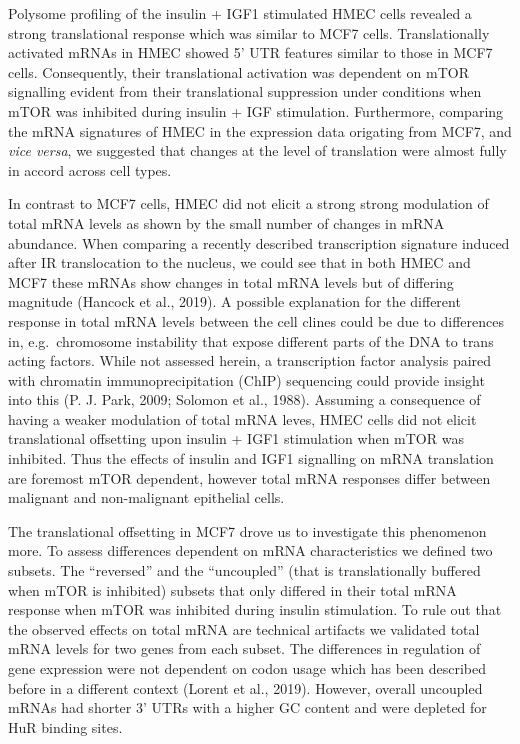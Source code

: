 \documentclass[12pt,openany]{book}
\begin{document}
Polysome profiling of the insulin + IGF1 stimulated HMEC cells revealed
a strong translational response which was similar to MCF7 cells.
Translationally activated mRNAs in HMEC showed 5' UTR features similar
to those in MCF7 cells. Consequently, their translational activation was
dependent on mTOR signalling evident from their translational
suppression under conditions when mTOR was inhibited during insulin +
IGF stimulation. Furthermore, comparing the mRNA signatures of HMEC in
the expression data origating from MCF7, and \emph{vice versa}, we
suggested that changes at the level of translation were almost fully in
accord across cell types.

In contrast to MCF7 cells, HMEC did not elicit a strong strong
modulation of total mRNA levels as shown by the small number of changes
in mRNA abundance. When comparing a recently described transcription
signature induced after IR translocation to the nucleus, we could see
that in both HMEC and MCF7 these mRNAs show changes in total mRNA levels
but of differing magnitude (Hancock et al., 2019). A possible
explanation for the different response in total mRNA levels between the
cell clines could be due to differences in, e.g.~chromosome instability
that expose different parts of the DNA to trans acting factors. While
not assessed herein, a transcription factor analysis paired with
chromatin immunoprecipitation (ChIP) sequencing could provide insight
into this (P. J. Park, 2009; Solomon et al., 1988). Assuming a
consequence of having a weaker modulation of total mRNA leves, HMEC
cells did not elicit translational offsetting upon insulin + IGF1
stimulation when mTOR was inhibited. Thus the effects of insulin and
IGF1 signalling on mRNA translation are foremost mTOR dependent, however
total mRNA responses differ between malignant and non-malignant
epithelial cells.

The translational offsetting in MCF7 drove us to investigate this
phenomenon more. To assess differences dependent on mRNA characteristics
we defined two subsets. The ``reversed'' and the ``uncoupled'' (that is
translationally buffered when mTOR is inhibited) subsets that only
differed in their total mRNA response when mTOR was inhibited during
insulin stimulation. To rule out that the observed effects on total mRNA
are technical artifacts we validated total mRNA levels for two genes
from each subset. The differences in regulation of gene expression were
not dependent on codon usage which has been described before in a
different context (Lorent et al., 2019). However, overall uncoupled
mRNAs had shorter 3' UTRs with a higher GC content and were depleted for
HuR binding sites.
\end{document}
